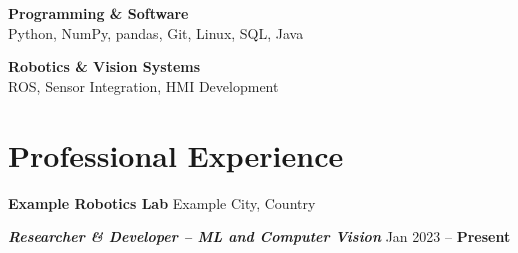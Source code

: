\documentclass[11pt,a4paper]{article}
\begin{document}
\vspace{0.4em}

\textbf{Programming \& Software} \\
Python, NumPy, pandas, Git, Linux, SQL, Java

\vspace{0.4em}

\textbf{Robotics \& Vision Systems} \\
ROS, Sensor Integration, HMI Development


\section*{\Large Professional Experience}

\textbf{Example Robotics Lab}
{\small \hfill Example City, Country}

{\small\textbf{\textit{Researcher \& Developer -- ML and Computer Vision}}
\hfill Jan 2023 -- \textbf{Present}}
\end{document}
